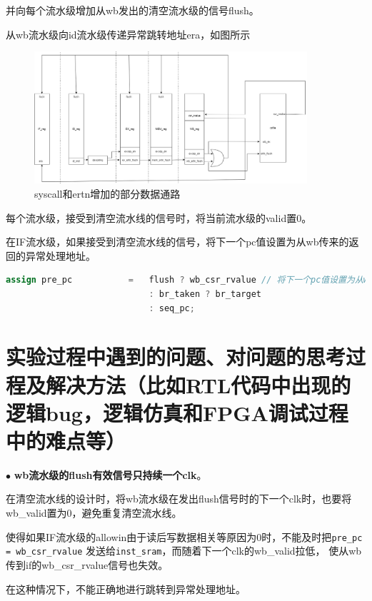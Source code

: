 \documentclass[11pt]{article}
\begin{document}
\begin{enumerate}
并向每个流水级增加从wb发出的清空流水级的信号flush。

从wb流水级向id流水级传递异常跳转地址era，如图所示
\begin{figure}[h!]
  \centering
  \includegraphics[width=0.9\textwidth]{./fig/fig1.png}
  \caption{syscall和ertn增加的部分数据通路}
\end{figure}
每个流水级，接受到清空流水线的信号时，将当前流水级的valid置0。

在IF流水级，如果接受到清空流水线的信号，将下一个pc值设置为从wb传来的返回的异常处理地址。
\begin{lstlisting}[language=verilog]
  assign pre_pc           =   flush ? wb_csr_rvalue // 将下一个pc值设置为从wb传来的返回的异常处理地址
                            : br_taken ? br_target 
                            : seq_pc;
\end{lstlisting}
\end{enumerate}




\vspace{1ex}

\section{实验过程中遇到的问题、对问题的思考过程及解决方法（比如RTL代码中出现的逻辑bug，逻辑仿真和FPGA调试过程中的难点等）}

\noindent
$\bullet$
\textbf{wb流水级的flush有效信号只持续一个clk}。

在清空流水线的设计时，将wb流水级在发出flush信号时的下一个clk时，也要将wb\_valid置为0，避免重复清空流水线。

使得如果IF流水级的allowin由于读后写数据相关等原因为0时，不能及时把\verb|pre_pc = wb_csr_rvalue| 发送给\verb|inst_sram|，而随着下一个clk的wb\_valid拉低，
使从wb传到if的wb_csr_rvalue信号也失效。

在这种情况下，不能正确地进行跳转到异常处理地址。
\end{document}
